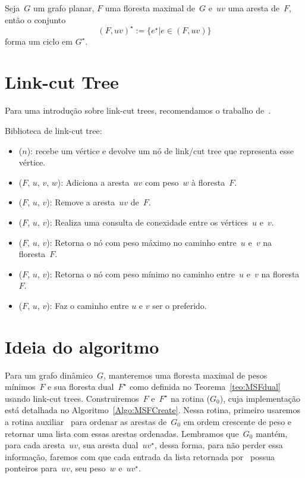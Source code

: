 \begin{theorem}
\label{teo:cutset}
Seja~$G$ um grafo planar, $F$ uma floresta maximal de~$G$ e~$uv$ uma aresta de~$F$, então o conjunto
$$
(F, uv)^\star := \{e^\star|e\in (F, uv)\}
$$
forma um ciclo em $G^\star$.
\end{theorem}

\section{Link-cut Tree}
\label{sec:linkcuttree}

Para uma introdução sobre link-cut trees, recomendamos o trabalho de~\cite{linkcuttree}.

Biblioteca de link-cut tree:
\begin{itemize}
\item \linkcutCreate($n$): recebe um vértice e devolve um nó de link/cut tree que representa esse vértice.
\item \linkcutAddEdge($F$, $u$, $v$, $w$): Adiciona a aresta~$uv$ com peso~$w$ à floresta~$F$.
\item \linkcutDelEdge($F$, $u$, $v$): Remove a aresta~$uv$ de~$F$.
\item \linkcutQuery($F$, $u$, $v$): Realiza uma consulta de conexidade entre os vértices~$u$ e~$v$.
\item \linkcutMax($F$, $u$, $v$): Retorna o nó com peso máximo no caminho entre~$u$ e~$v$ na floresta~$F$.
\item \linkcutMin($F$, $u$, $v$): Retorna o nó com peso mínimo no caminho entre~$u$ e~$v$ na floresta~$F$.
\item \linkcutPath($F$, $u$, $v$): Faz o caminho entre $u$ e $v$ ser o preferido.
\end{itemize}

\section{Ideia do algoritmo}
Para um grafo dinâmico~$G$, manteremos uma floresta maximal de pesos mínimos~$F$ e sua floresta dual~$F^\star$ como definida no Teorema~\ref{teo:MSFdual} usando link-cut trees.
Construiremos~$F$ e~$F^\star$ na rotina \MSFCreate($G_0$), cuja implementação está detalhada no Algoritmo~\ref{Algo:MSFCreate}.
Nessa rotina, primeiro usaremos a rotina auxiliar~\order{} para ordenar as arestas de~$G_0$ em ordem crescente de peso e retornar uma lista com essas arestas ordenadas.
Lembramos que~$G_0$ mantém, para cada aresta~$uv$, sua aresta dual~$uv^\star$, dessa forma, para não perder essa informação, faremos com que cada entrada da lista retornada por~\order{}
possua ponteiros para~$uv$, seu peso~$w$ e~$uv^\star$.

